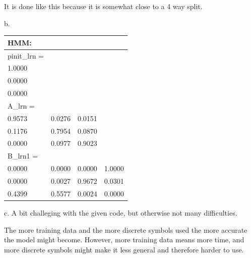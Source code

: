 It is done like this because it is somewhat close to a 4 way split.

b.
\begin{table}[!h]
	\begin{tabular}{|l|l|l|l|}
		\hline
		HMM:         &        &        &        \\ \hline
		pinit\_lrn = &        &        &        \\ \hline
		1.0000       &        &        &        \\ \hline
		0.0000       &        &        &        \\ \hline
		0.0000       &        &        &        \\ \hline
		A\_lrn =     &        &        &        \\ \hline
		0.9573       & 0.0276 & 0.0151 &        \\ \hline
		0.1176       & 0.7954 & 0.0870 &        \\ \hline
		0.0000       & 0.0977 & 0.9023 &        \\ \hline
		B\_lrn1 =    &        &        &        \\ \hline
		0.0000       & 0.0000 & 0.0000 & 1.0000 \\ \hline
		0.0000       & 0.0027 & 0.9672 & 0.0301 \\ \hline
		0.4399       & 0.5577 & 0.0024 & 0.0000 \\ \hline
	\end{tabular}
\end{table}

c.
A bit challeging with the given code, but otherwise not many difficulties.

The more training data and the more discrete symbols used the more accurate the model might become.
However, more training data means more time, and more discrete symbols might make it less general and therefore harder to use.

